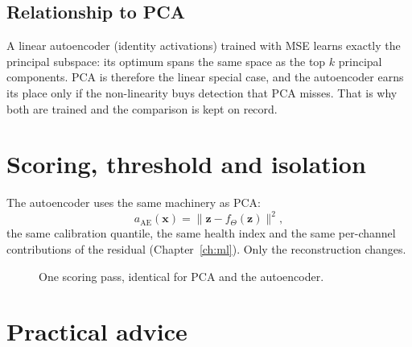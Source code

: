 \subsection{Relationship to PCA}
A linear autoencoder (identity activations) trained with MSE learns exactly
the principal subspace: its optimum spans the same space as the top $k$
principal components. PCA is therefore the linear special case, and the
autoencoder earns its place only if the non-linearity buys detection that PCA
misses. That is why both are trained and the comparison is kept on record.

\section{Scoring, threshold and isolation}

The autoencoder uses the same machinery as PCA:
\begin{equation}
  a_\text{AE}(\bm x) = \lVert \bm z - f_\Theta(\bm z) \rVert^2,
\end{equation}
the same calibration quantile, the same health index and the same
per-channel contributions of the residual (Chapter~\ref{ch:ml}). Only the
reconstruction changes.

\begin{figure}[htbp]
\centering
{}
\caption{One scoring pass, identical for PCA and the autoencoder.}
\label{fig:aescore}
\end{figure}

\section{Practical advice}

